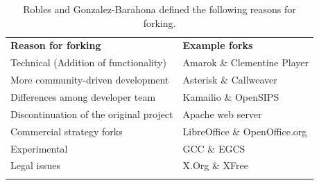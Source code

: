 \documentclass[12pt,letterpaper]{gthesis2}  %
\begin{document}
\begin{table}[!ht]
\centering
\caption[The main reasons for forking]{Robles and Gonzalez-Barahona \cite{Robles} defined the following reasons for forking.}
\label{tableReasonsForForking}
\begin{tabular}{p{} p{}}
\hline\noalign{\smallskip}
\textbf{Reason for forking} & \textbf{Example forks} \\
\noalign{\smallskip}\hline\noalign{\smallskip}
Technical (Addition of functionality) & Amarok \& Clementine Player \\ \hline
More community-driven development & Asterisk \& Callweaver \\ \hline
Differences among developer team & Kamailio \& OpenSIPS \\ \hline
Discontinuation of the original project & Apache web server \\ \hline
Commercial strategy forks & LibreOffice \& OpenOffice.org \\ \hline
Experimental & GCC \& EGCS \\ \hline
Legal issues & X.Org \& XFree\\
\noalign{\smallskip}\hline
\end{tabular}
\end{table}


\end{document}
